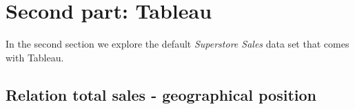 \documentclass[openany]{article}
\begin{document}
\clearpage
\section {Second part: Tableau}

In the second section we explore the default \textit{Superstore Sales} data set that comes with Tableau.

\subsection {Relation total sales - geographical position}
\end{document}
